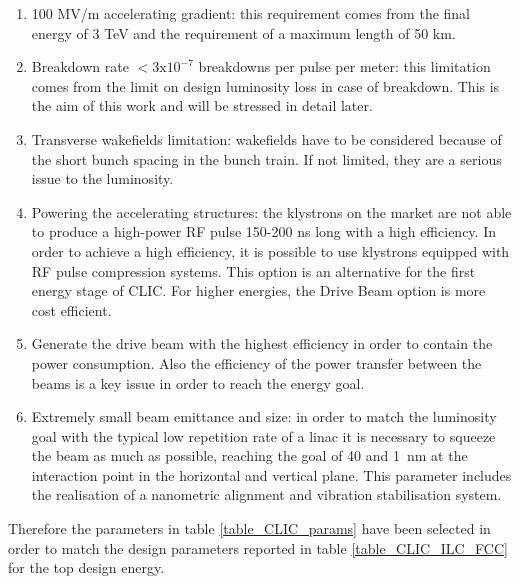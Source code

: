 \begin{enumerate}
\item 100 MV/m accelerating gradient: this requirement comes from the final energy of 3 TeV and the requirement of a maximum length of 50 km.
\item Breakdown rate $< 3\text{x}10^{-7}$ breakdowns per pulse per meter: this limitation comes from the limit on design luminosity loss in case of breakdown. This is the aim of this work and will be stressed in detail later.
\item Transverse wakefields limitation: wakefields have to be considered because of the short bunch spacing in the bunch train. If not limited, they are a serious issue to the luminosity.
\item Powering the accelerating structures: the klystrons on the market are not able to produce a high-power RF pulse 150-200 ns long with a high efficiency. In order to achieve a high efficiency, it is possible to use klystrons equipped with RF pulse compression systems. This option is an alternative for the first energy stage of CLIC. For higher energies, the Drive Beam option is more cost efficient.
\item Generate the drive beam with the highest efficiency in order to contain the power consumption. Also the efficiency of the power transfer between the beams is a key issue in order to reach the energy goal.
\item Extremely small beam emittance and size: in order to match the luminosity goal with the typical low repetition rate of a linac it is necessary to squeeze the beam as much as possible, reaching the goal of 40 and 1~nm at the interaction point in the horizontal and vertical plane. This parameter includes the realisation of a nanometric alignment and vibration stabilisation system.
\end{enumerate}



Therefore the parameters in table \ref{table_CLIC_params} have been selected in order to match the design parameters reported in table \ref{table_CLIC_ILC_FCC} for the top design energy.


